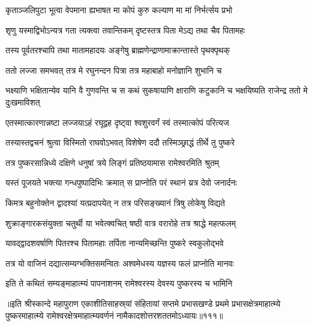 \twolineshloka
{कृताञ्जलिपुटा भूत्वा वेपमाना ह्यभाषत}
{मा कोपं कुरु कल्याण मा मां निर्भर्त्सय प्रभो}%

\twolineshloka
{शृणु यस्माद्विभोऽन्यत्र गता त्यक्त्वा तवान्तिकम्}
{दृष्टस्तत्र पिता मेऽद्य तथा चैव पितामहः}%

\twolineshloka
{तस्य पूर्वतरश्चापि तथा मातामहादयः}
{अङ्गेषु ब्राह्मणेन्द्राणामाक्रान्तास्ते पृथक्पृथक्}%

\twolineshloka
{ततो लज्जा समभवत् तत्र मे रघुनन्दन}
{पित्रा तत्र महाबाहो मनोज्ञानि शुभानि च}%

\threelineshloka
{भक्ष्याणि भक्षितान्येव यानि वै गुणवन्ति च}
{स कथं सुकषायाणि क्षाराणि कटुकानि च}
{भक्षयिष्यति राजेन्द्र ततो मे दुःखमाविशत्}%

\twolineshloka
{एतस्मात्कारणान्नष्टा लज्जयाऽहं रघूद्वह}
{दृष्ट्वा श्वशुरवर्गं स्वं तस्मात्कोपं परित्यज}%

\twolineshloka
{तस्यास्तद्वचनं श्रुत्वा विस्मितो राघवोऽभवत्}
{विशेषेण ददौ तस्मिञ्छ्राद्धं तीर्थे तु पुष्करे}%

\twolineshloka
{तत्र पुष्करसान्निध्ये दक्षिणे धनुषां त्रये}
{लिङ्गं प्रतिष्ठयामास रामेश्वरमिति श्रुतम्}%

\twolineshloka
{यस्तं पूजयते भक्त्या गन्धपुष्पादिभिः क्रमात्}
{स प्राप्नोति परं स्थानं य्रत्र देवो जनार्दनः}%

\twolineshloka
{किमत्र बहुनोक्तेन द्वादश्यां यत्प्रदापयेत्}
{न तत्र परिसङ्ख्यानं त्रिषु लोकेषु विद्यते}%

\twolineshloka
{शुक्राङ्गारकसंयुक्ता चतुर्थी या भवेत्क्वचित्}
{षष्ठी वात्र वरारोहे तत्र श्राद्धे महत्फलम्}%

\twolineshloka
{यावद्द्वादशवर्षाणि पितरश्च पितामहाः}
{तर्पिता नान्यमिच्छन्ति पुष्करे स्वकुलोद्भवे}%

\twolineshloka
{तत्र यो वाजिनं दद्यात्सम्यग्भक्तिसमन्वितः}
{अश्वमेधस्य यज्ञस्य फलं प्राप्नोति मानवः}%

\twolineshloka
{इति ते कथितं सम्यङ्माहात्म्यं पापनाशनम्}
{रामेश्वरस्य देवस्य पुष्करस्य च भामिनि}%

॥इति श्रीस्कान्दे महापुराण एकाशीतिसाहस्र्यां संहितायां सप्तमे प्रभासखण्डे प्रथमे प्रभासक्षेत्रमाहात्म्ये पुष्करमाहात्म्ये रामेश्वरक्षेत्रमाहात्म्यवर्णनं नामैकादशोत्तरशततमोऽध्यायः॥१११॥